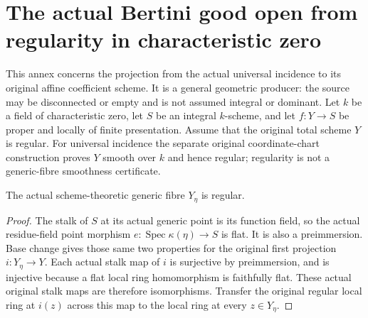 \section{The actual Bertini good open from regularity in characteristic zero}

This annex concerns the projection from the actual universal incidence to its
original affine coefficient scheme.  It is a general geometric producer: the
source may be disconnected or empty and is not assumed integral or dominant.
Let $k$ be a field of characteristic zero, let $S$ be an integral $k$-scheme,
and let $f:Y\to S$ be proper and locally of finite presentation.  Assume that
the original total scheme $Y$ is regular.  For universal incidence the separate
original coordinate-chart construction proves $Y$ smooth over $k$ and hence
regular; regularity is not a generic-fibre smoothness certificate.

\begin{lemma}
\label{lem:kn-nadel-bertini-generic-regular}
\leanok
The actual scheme-theoretic generic fibre $Y_\eta$ is regular.
\end{lemma}
\begin{proof}
The stalk of $S$ at its actual generic point is its function field, so the
actual residue-field point morphism $e:\operatorname{Spec}\kappa(\eta)\to S$
is flat.  It is also a preimmersion.  Base change gives those same two
properties for the original first projection $i:Y_\eta\to Y$.  Each actual
stalk map of $i$ is surjective by preimmersion, and is injective because a flat
local ring homomorphism is faithfully flat.  These actual original stalk maps
are therefore isomorphisms.  Transfer the original regular local ring at
$i(z)$ across this map to the local ring at every $z\in Y_\eta$.
\end{proof}

